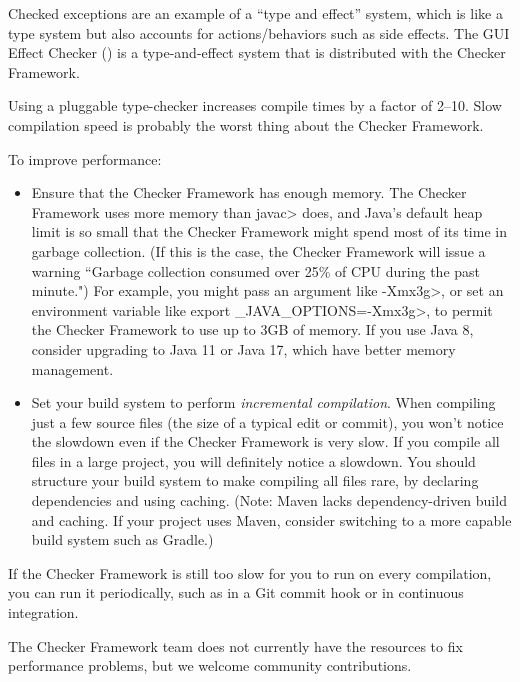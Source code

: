 Checked exceptions are an example of a ``type and effect'' system, which is
like a type system but also accounts for actions/behaviors such as side
effects.  The GUI Effect Checker () is a
type-and-effect system that is distributed with the Checker Framework.



Using a pluggable type-checker increases compile times by a factor of 2--10.
Slow compilation speed is probably the worst thing about the Checker
Framework.

To improve performance:
\begin{itemize}
\item
  Ensure that the Checker Framework has enough memory.  The Checker
  Framework uses more memory than \<javac> does, and Java's default heap
  limit is so small that the Checker Framework might spend most of its time
  in garbage collection.  (If this is the case, the Checker Framework will
  issue a warning ``Garbage collection consumed over 25\% of CPU during the
  past minute.")  For example, you might pass an argument like
  \<-Xmx3g>, or set an environment variable like \<export
  \_JAVA\_OPTIONS=-Xmx3g>, to permit the Checker Framework to use up to 3GB
  of memory.  If you use Java 8, consider upgrading to Java 11 or Java 17, which have
  better memory management.
\item
  Set your build system to perform \emph{incremental compilation}.  When
  compiling just a few source files (the size of a typical edit or commit),
  you won't notice the slowdown even if the Checker Framework is very slow.
  If you compile all files in a large project, you will definitely notice a
  slowdown.  You should structure your build system to make compiling all
  files rare, by declaring dependencies and using caching.
  (Note: Maven lacks dependency-driven build and caching.  If your project
  uses Maven, consider switching to a more capable build system such as Gradle.)
\end{itemize}

If the Checker Framework is still too slow for you to run on every compilation,
you can run it periodically, such as in a Git commit hook or in continuous
integration.

The Checker Framework team does not currently have the resources to fix
performance problems, but we welcome community contributions.

